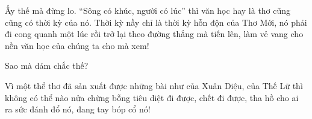 \documentclass[../main.tex]{subfiles}
\begin{document}
\begin{multicols}{2}
Ấy thế mà đừng lo. “Sông có khúc, người có lúc” thì văn học hay là thơ cũng cũng có thời kỳ của nó. Thời kỳ nầy chỉ là thời kỳ hỗn độn của Thơ Mới, nó phải đi cong quanh một lúc rồi trở lại theo đường thẳng mà tiến lên, làm vẻ vang cho nền văn học của chúng ta cho mà xem!  
 
Sao mà dám chắc thế? 
 
Vì một thể thơ đã sản xuất được những bài như của Xuân Diệu, của Thế Lữ thì không có thể nào nửa chừng bỗng tiêu diệt đi được, chết đi được, tha hồ cho ai ra sức đánh đổ nó, đang tay bóp cổ nó! 
\end{multicols}
\end{document}
